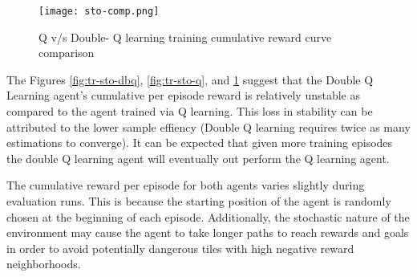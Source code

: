 \documentclass{article} %
\begin{document}

\begin{figure}[H]
    \centering
    \texttt{[image: sto-comp.png]}
    \caption{Q v/s Double- Q learning training cumulative reward curve comparison}
    \label{fig:sto-comp}
\end{figure}

The Figures \ref{fig:tr-sto-dbq}, \ref{fig:tr-sto-q}, and \ref{fig:sto-comp} suggest that
the Double Q Learning agent's cumulative per episode reward is relatively unstable as compared
to the agent trained via Q learning. This loss in stability can be attributed to the lower sample
effiency (Double Q learning requires twice as many estimations to converge). It can be expected
that given more training episodes the double Q learning agent will eventually out perform the Q 
learning agent.

The cumulative reward per episode for both agents varies slightly during evaluation runs.
This is because the starting position of the agent is randomly chosen at the beginning of
each episode. Additionally, the stochastic nature of the environment may cause the agent to
take longer paths to reach rewards and goals in order to avoid potentially dangerous tiles
with high negative reward neighborhoods.
\end{document}
